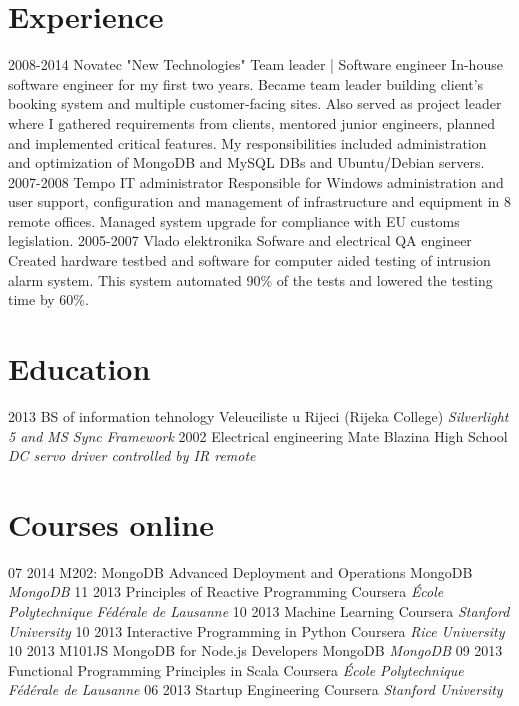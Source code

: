 \documentclass[]{cv}
\begin{document}
\section{Experience}
\begin{entrylist}
  \entry
    {2008-2014}
    {Novatec "New Technologies"}
    {Team leader | Software engineer}
    {In-house software engineer for my first two years. Became team leader building client's booking system and multiple customer-facing sites. Also served as project leader where I gathered requirements from clients, mentored junior engineers, planned and implemented critical features. My responsibilities included administration and optimization of MongoDB and MySQL DBs and Ubuntu/Debian servers.}
  \entry
    {2007-2008}
    {Tempo}
    {IT administrator}
    {Responsible for Windows administration and user support, configuration and management of infrastructure and equipment in 8 remote offices. Managed system upgrade for compliance with EU customs legislation.}
  \entry
    {2005-2007}
    {Vlado elektronika}
    {Sofware and electrical QA engineer}
    {Created hardware testbed and software for computer aided testing of intrusion alarm system. This system automated 90\% of the tests and lowered the testing time by 60\%.}
\end{entrylist}

\section{Education}
\begin{entrylist}
  \entry
    {2013}
    {BS of information tehnology}
    {Veleuciliste u Rijeci (Rijeka College)}
    {\emph{Silverlight 5 and MS Sync Framework}}
  \entry
    {2002}
    {Electrical engineering}
    {Mate Blazina High School}
    {\emph{DC servo driver controlled by IR remote}}
\end{entrylist}
\section{Courses online}
\begin{entrylist}
  \entry
    {07 2014} 
    {M202: MongoDB Advanced Deployment and Operations}
    {MongoDB}
    {\emph{MongoDB}}
  \entry
    {11 2013}
    {Principles of Reactive Programming}
    {Coursera}
    {\emph{École Polytechnique Fédérale de Lausanne}}
  \entry
    {10 2013}
    {Machine Learning} 
    {Coursera}
    {\emph{Stanford University}}
  \entry
    {10 2013}
    {Interactive Programming in Python}
    {Coursera}
    {\emph{Rice University}}
  \entry
    {10 2013}
    {M101JS MongoDB for Node.js Developers}
    {MongoDB}
    {\emph{MongoDB}}
  \entry
    {09 2013}
    {Functional Programming Principles in Scala}
    {Coursera}
    {\emph{École Polytechnique Fédérale de Lausanne}}
  \entry
    {06 2013}
    {Startup Engineering}
    {Coursera}
    {\emph{Stanford University}}
\end{entrylist}
\end{document}
